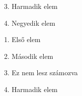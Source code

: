 \documentclass[12pt]{book}
\begin{document}
\hulipsum[1]

\begin{enumerate}
    \setcounter{enumi}{2}  %
    \item Harmadik elem
    \item Negyedik elem
\end{enumerate}

\begin{enumerate}
    \item Első elem
    \item Második elem
    \item[] Ez nem lesz számozva
    \item Harmadik elem
\end{enumerate}
\end{document}
